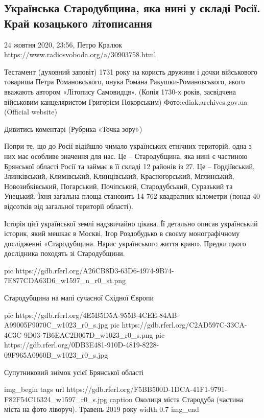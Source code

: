  
 

\subsection{Українська Стародубщина, яка нині у складі Росії. Край козацького літописання}
24 жовтня 2020, 23:56, Петро Кралюк
\url{https://www.radiosvoboda.org/a/30903758.html}

Тестамент (духовний заповіт) 1731 року на користь дружини і дочки військового
товариша Петра Романовського, онука Романа Ракушки-Романовського, якого
вважають автором «Літопису Самовидця». (Копія 1730-х років, засвідчена
військовим канцеляристом Григорієм Покорським) Фото:cdiak.archives.gov.ua
(Official website)

Дивитись коментарі (Рубрика «Точка зору»)

Попри те, що до Росії відійшло чимало українських етнічних територій, одна з
них має особливе значення для нас. Це – Стародубщина, яка нині є частиною
Брянської області Росії та займає в її складі 12 районів із 27. Це –
Гордіївський, Злинківський, Климівський, Клинцівський, Красногорський,
Мглинський, Новозибківський, Погарський, Почіпський, Стародубський, Суразький
та Унецький. Їхня загальна площа становить 14 762 квадратних кілометри (понад
40 відсотків від загальної території області).

Історія цієї української землі надзвичайно цікава. Її детально описав
український історик, який мешкає в Москві, Ігор Роздобудько в своєму
монографічному дослідженні «Стародубщина. Нарис українського життя краю».
Предки цього дослідника походять зі Стародубщини.

\ifcmt
pic https://gdb.rferl.org/A26CB8D3-63D6-4974-9B74-7E877CDA63D6_w1597_n_r0_st.png
\fi

Стародубщина на мапі сучасної Східної Європи

\ifcmt
pic https://gdb.rferl.org/4E5B5D5A-955B-4CEE-84AB-A99005F9070C_w1023_r0_s.jpg
pic https://gdb.rferl.org/C2AD597C-33CA-4C3C-9D03-7B6EAC2B067D_w1023_r0_s.png
pic https://gdb.rferl.org/0DB3E481-910D-4819-8228-09F965A0960B_w1023_r0_s.jpg
\fi

Супутниковий знімок усієї Брянської області

\ifcmt
img_begin 
  tags 
  url https://gdb.rferl.org/F5BB500D-1DCA-41F1-9791-F82F54C16324_w1597_r0_s.jpg
  caption Околиця міста Стародуба (частина міста на фото ліворуч). Травень 2019 року
  width 0.7
img_end
\fi

